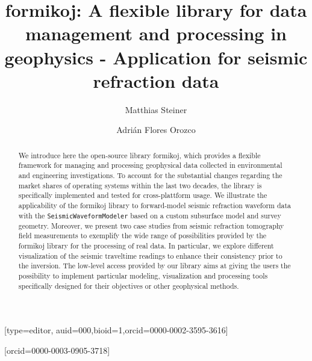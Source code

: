 \documentclass[a4paper,fleqn]{cas-sc}
\begin{document}
\let\WriteBookmarks\relax
\def\floatpagepagefraction{1}
\def\textpagefraction{.001}

\title [mode = title]{formikoj: A flexible library for data management and processing in geophysics - Application for seismic refraction data}


\author[1]{Matthias Steiner}[type=editor,
                        auid=000,bioid=1,orcid=0000-0002-3595-3616]
\cormark[1]

\author[1]{Adrián {Flores Orozco}}[orcid=0000-0003-0905-3718] 

\address[1]{Research Unit Geophysics, Department of Geodesy and Geoinformation, TU Wien}

\begin{abstract}
We introduce here the open-source library formikoj, which provides a flexible framework for managing and processing geophysical data collected in environmental and engineering investigations. To account for the substantial changes regarding the market shares of operating systems within the last two decades, the library is specifically implemented and tested for cross-plattform usage.
We illustrate the applicability of the formikoj library to forward-model seismic refraction waveform data with the \texttt{SeismicWaveformModeler} based on a custom subsurface model and survey geometry. 
Moreover, we present two case studies from seismic refraction tomography field measurements to exemplify the wide range of possibilities provided by the formikoj library for the processing of real data. In particular, we explore different visualization of the seismic traveltime readings to enhance their consistency prior to the inversion. 
The low-level access provided by our library aims at giving the users the possibility to implement particular modeling, visualization and processing tools specifically designed for their objectives or other geophysical methods.
\end{abstract}
 
\end{document}

